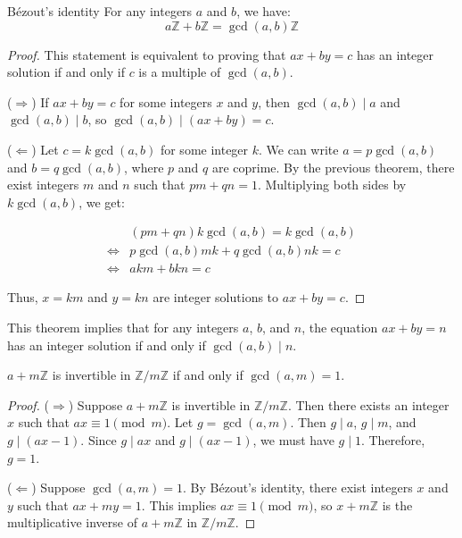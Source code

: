 \documentclass{article}
\begin{document}
\begin{theorem}{Bézout's identity}{}
For any integers $a$ and $b$, we have:
    \begin{equation}
        a\mathbb{Z} + b \mathbb{Z} = \gcd(a, b)\mathbb{Z}
    \end{equation}
\end{theorem}

\begin{proof}
This statement is equivalent to proving that $ax + by = c$ has an integer solution if and only if $c$ is a multiple of $\gcd(a,b)$.

($\Rightarrow$) If $ax + by = c$ for some integers $x$ and $y$, then $\gcd(a,b) \mid a$ and $\gcd(a,b) \mid b$, so $\gcd(a,b) \mid (ax + by) = c$.

($\Leftarrow$) Let $c = k\gcd(a,b)$ for some integer $k$. We can write $a = p\gcd(a,b)$ and $b = q\gcd(a,b)$, where $p$ and $q$ are coprime. By the previous theorem, there exist integers $m$ and $n$ such that $pm + qn = 1$. Multiplying both sides by $k\gcd(a,b)$, we get:

\begin{align*}
    &(pm + qn)k\gcd(a, b) = k \gcd(a, b) \\
    \iff& p \gcd(a, b) mk + q \gcd(a, b) nk = c \\
    \iff& akm + bkn = c
\end{align*}

Thus, $x = km$ and $y = kn$ are integer solutions to $ax + by = c$.
\end{proof}

This theorem implies that for any integers $a$, $b$, and $n$, the equation $ax + by = n$ has an integer solution if and only if $\gcd(a,b) \mid n$.

\begin{theorem}{}{}
$a + m\mathbb{Z}$ is invertible in $\mathbb{Z}/m\mathbb{Z}$ if and only if $\gcd(a,m) = 1$.
\end{theorem}

\begin{proof}
($\Rightarrow$) Suppose $a + m\mathbb{Z}$ is invertible in $\mathbb{Z}/m\mathbb{Z}$. Then there exists an integer $x$ such that $ax \equiv 1 \pmod{m}$. Let $g = \gcd(a,m)$. Then $g \mid a$, $g \mid m$, and $g \mid (ax - 1)$. Since $g \mid ax$ and $g \mid (ax - 1)$, we must have $g \mid 1$. Therefore, $g = 1$.

($\Leftarrow$) Suppose $\gcd(a,m) = 1$. By Bézout's identity, there exist integers $x$ and $y$ such that $ax + my = 1$. This implies $ax \equiv 1 \pmod{m}$, so $x + m\mathbb{Z}$ is the multiplicative inverse of $a + m\mathbb{Z}$ in $\mathbb{Z}/m\mathbb{Z}$.
\end{proof}
\end{document}
